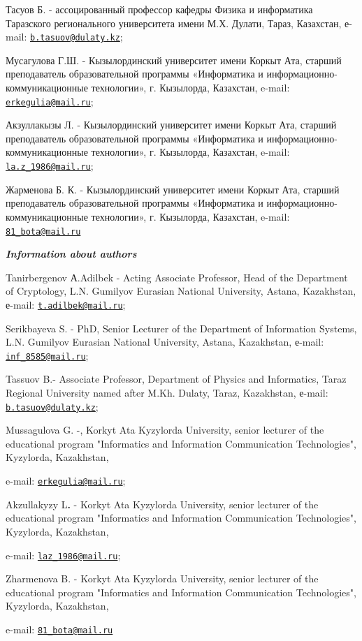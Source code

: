 Тасуов Б. - ассоцированный профессор кафедры Физика и информатика
Таразского регионального университета имени М.Х. Дулати, Тараз,
Казахстан, е-mail:
\href{mailto:b.tasuov@dulaty.kz}{\nolinkurl{b.tasuov@dulaty.kz}};

Мусагулова Г.Ш. - Кызылординский университет имени Коркыт Ата, старший
преподаватель образовательной программы «Информатика и
информационно-коммуникационные технологии», г. Кызылорда, Казахстан,
e-mail: \href{mailto:erkegulia@mail.ru}{\nolinkurl{erkegulia@mail.ru}};

Акзуллакызы Л. - Кызылординский университет имени Коркыт Ата, старший
преподаватель образовательной программы «Информатика и
информационно-коммуникационные технологии», г. Кызылорда, Казахстан,
e-mail: \href{mailto:la.z_1986@mail.ru}{\nolinkurl{la.z\_1986@mail.ru}};

Жарменова Б. К. - Кызылординский университет имени Коркыт Ата, старший
преподаватель образовательной программы «Информатика и
информационно-коммуникационные технологии», г. Кызылорда, Казахстан,
e-mail: \href{mailto:81_bota@mail.ru}{\nolinkurl{81\_bota@mail.ru}}

\emph{{\bfseries Information about authors}}

Tanirbergenov А.Adilbek - Acting Associate Professor, Head of the
Department of Cryptology, L.N. Gumilyov Eurasian National University,
Astana, Kazakhstan, е-mail:
\href{mailto:t.adilbek@mail.ru}{\nolinkurl{t.adilbek@mail.ru}};

Serikbayeva S. - PhD, Senior Lecturer of the Department of Information
Systems, L.N. Gumilyov Eurasian National University, Astana, Kazakhstan,
е-mail: \href{mailto:inf_8585@mail.ru}{\nolinkurl{inf\_8585@mail.ru}};

Tassuov B.- Associate Professor, Department of Physics and Informatics,
Taraz Regional University named after M.Kh. Dulaty, Taraz, Kazakhstan,
е-mail:
\href{mailto:b.tasuov@dulaty.kz}{\nolinkurl{b.tasuov@dulaty.kz}};

Mussagulova G. -, Korkyt Ata Kyzylorda University, senior lecturer of
the educational program "Informatics and Information Communication
Technologies", Kyzylorda, Kazakhstan,

e-mail: \href{mailto:erkegulia@mail.ru}{\nolinkurl{erkegulia@mail.ru}};

Akzullakyzy L{\bfseries .} - Korkyt Ata Kyzylorda University, senior
lecturer of the educational program "Informatics and Information
Communication Technologies", Kyzylorda, Kazakhstan,

e-mail: \href{mailto:laz_1986@mail.ru}{\nolinkurl{laz\_1986@mail.ru}};

Zharmenova B. - Korkyt Ata Kyzylorda University, senior lecturer of the
educational program "Informatics and Information Communication
Technologies", Kyzylorda, Kazakhstan,

e-mail: \href{mailto:81_bota@mail.ru}{\nolinkurl{81\_bota@mail.ru}}

